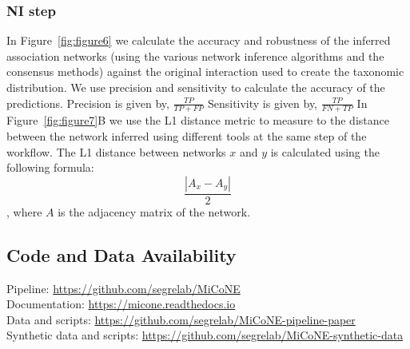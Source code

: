   \subsubsection*{NI step}
  In Figure~\ref{fig:figure6} we calculate the accuracy and robustness of the inferred association networks (using the various network inference algorithms and the consensus methods) against the original interaction used to create the taxonomic distribution.
  We use precision and sensitivity to calculate the accuracy of the predictions.
  Precision is given by, $\frac{TP}{TP + FP}$
  Sensitivity is given by, $\frac{TP}{FN + TP}$
  In Figure~\ref{fig:figure7}B we use the L1 distance metric to measure to the distance between the network inferred using different tools at the same step of the workflow.
  The L1 distance between networks $x$ and $y$ is calculated using the following formula:
  $$ \frac{|A_{x}-A_{y}|}{2} $$, where $A$ is the adjacency matrix of the network.

  \subsection*{Code and Data Availability}
  Pipeline: \href{https://github.com/segrelab/MiCoNE}{https://github.com/segrelab/MiCoNE} \\
  Documentation: \href{https://micone.readthedocs.io}{https://micone.readthedocs.io} \\
  Data and scripts: \href{https://github.com/segrelab/MiCoNE-pipeline-paper}{https://github.com/segrelab/MiCoNE-pipeline-paper} \\
  Synthetic data and scripts: \href{https://github.com/segrelab/MiCoNE-synthetic-data}{https://github.com/segrelab/MiCoNE-synthetic-data}

